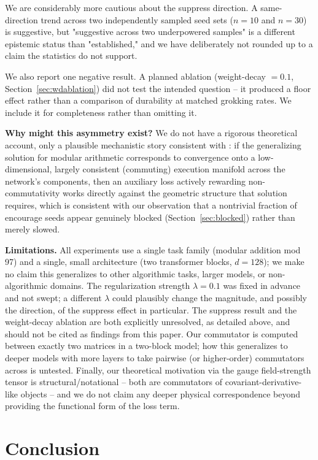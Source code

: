 \documentclass[11pt]{article}
\begin{document}
We are considerably more cautious about the suppress direction. A
same-direction trend across two independently sampled seed sets ($n=10$
and $n=30$) is suggestive, but "suggestive across two underpowered
samples" is a different epistemic status than "established," and we have
deliberately not rounded up to a claim the statistics do not support.

We also report one negative result. A planned ablation (weight-decay
$=0.1$, Section~\ref{sec:wdablation}) did not test the intended question
-- it produced a floor effect rather than a comparison of durability at
matched grokking rates. We include it for completeness rather than
omitting it.

\textbf{Why might this asymmetry exist?} We do not have a rigorous
theoretical account, only a plausible mechanistic story consistent with
\citet{xu2026a,xu2026b}: if the generalizing solution for modular
arithmetic corresponds to convergence onto a low-dimensional, largely
consistent (commuting) execution manifold across the network's components,
then an auxiliary loss actively rewarding non-commutativity works directly
against the geometric structure that solution requires, which is
consistent with our observation that a nontrivial fraction of encourage
seeds appear genuinely blocked (Section~\ref{sec:blocked}) rather than
merely slowed.

\textbf{Limitations.} All experiments use a single task family (modular
addition mod 97) and a single, small architecture (two transformer
blocks, $d{=}128$); we make no claim this generalizes to other algorithmic
tasks, larger models, or non-algorithmic domains. The regularization
strength $\lambda=0.1$ was fixed in advance and not swept; a different
$\lambda$ could plausibly change the magnitude, and possibly the
direction, of the suppress effect in particular. The suppress result and
the weight-decay ablation are both explicitly unresolved, as detailed
above, and should not be cited as findings from this paper. Our
commutator is computed between exactly two matrices in a two-block model;
how this generalizes to deeper models with more layers to take pairwise
(or higher-order) commutators across is untested. Finally, our
theoretical motivation via the gauge field-strength tensor is
structural/notational -- both are commutators of covariant-derivative-like
objects -- and we do not claim any deeper physical correspondence beyond
providing the functional form of the loss term.

\section{Conclusion}
\end{document}
